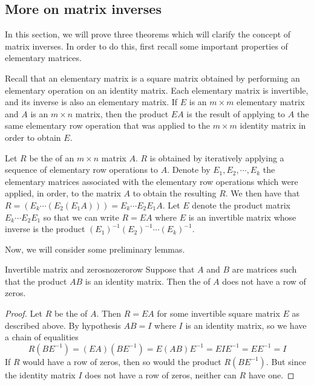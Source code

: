 \subsection{More on matrix inverses}

In this section, we will prove three theorems which will clarify the concept of matrix inverses. In order to do this, first recall some important properties of elementary matrices. 

Recall that an elementary matrix is a square matrix obtained by performing an elementary operation on an identity matrix. Each elementary matrix is invertible, and its inverse is also an elementary matrix. If $E$ is an $m \times m$ elementary matrix and $A$ is an $m \times n$ matrix, then the product $EA$ is the result of applying to $A$ the same elementary row operation that was applied to the $m \times m$ identity matrix in order to obtain $E$.

Let $R$ be the {\rref} of an $m \times n$ matrix $A$. $R$ is obtained by iteratively applying a sequence of elementary row operations to $A$. Denote by $E_1, E_2, \cdots, E_k$ the elementary matrices associated with the elementary row operations which were applied, in order, to the matrix $A$ to obtain the resulting $R$. We then have that $R = \left( E_k \cdots \left( E_2 \left( E_1A \right) \right)\right) = E_k \cdots E_2E_1A$. Let $E$ denote the product matrix $E_k \cdots E_2E_1$ so that we can write $R=EA$ where $E$ is an invertible matrix whose inverse is the product $(E_1)^{-1}(E_2)^{-1} \cdots (E_k)^{-1}$.

Now, we will consider some preliminary lemmas. 

\begin{lemma}{Invertible matrix and zeros}{nozerorow}
Suppose that $A$ and $B$ are matrices such that the product $AB$ is an identity matrix. Then the {\rref} of $A$ does not have a row of zeros.
\end{lemma}

\begin{proof}
Let $R$ be the {\rref} of $A$. Then $R=EA$ for some invertible square matrix $E$ as described above. By hypothesis $AB=I$ where $I$ is an identity matrix, so we have a chain of equalities
\begin{equation*}
R(BE^{-1})
=
(EA)(BE^{-1})
=
E(AB)E^{-1}
=
EIE^{-1}
=
EE^{-1}
=
I
\end{equation*}
If $R$ would have a row of zeros, then so would the product $R(BE^{-1})$. But since the identity matrix $I$ does not have a row of zeros, neither can $R$ have one.
\end{proof}

